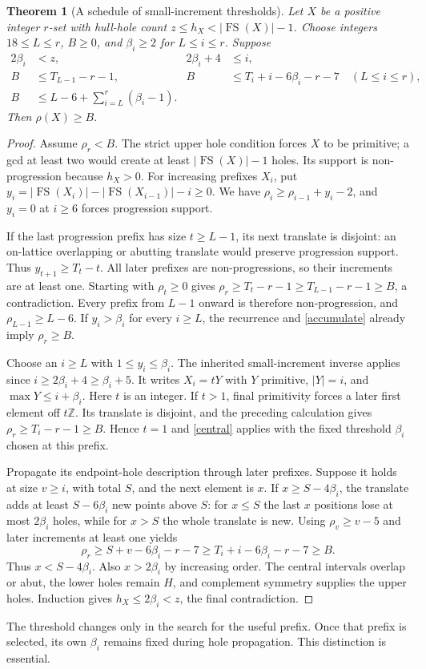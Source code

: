\documentclass[11pt,a4paper]{article}
\newcommand{\FS}{\operatorname{FS}}
\newcommand{\Z}{\mathbb Z}
\newtheorem{theorem}{Theorem}[section]
\begin{document}
\begin{theorem}[A schedule of small-increment thresholds]\label{schedule}
Let $X$ be a positive integer $r$-set with hull-hole count
$z\le h_X<|\FS(X)|-1$. Choose integers $18\le L\le r$, $B\ge0$,
and $\beta_i\ge2$ for $L\le i\le r$. Suppose
\begin{align}
 2\beta_i&<z,& 2\beta_i+4&\le i,\label{local}\\
 B&\le T_{L-1}-r-1,&
 B&\le T_i+i-6\beta_i-r-7\quad(L\le i\le r),\label{escape}\\
 B&\le L-6+\sum_{i=L}^r(\beta_i-1).&&\label{accumulate}
\end{align}
Then $\rho(X)\ge B$.
\end{theorem}
\begin{proof}
Assume $\rho_r<B$. The strict upper hole condition forces $X$ to
be primitive; a gcd at least two would create at least
$|\FS(X)|-1$ holes. Its support is non-progression because $h_X>0$.
For increasing prefixes $X_i$, put
$y_i=|\FS(X_i)|-|\FS(X_{i-1})|-i\ge0$.
We have $\rho_i\ge\rho_{i-1}+y_i-2$, and $y_i=0$ at $i\ge6$
forces progression support.

If the last progression prefix has size $t\ge L-1$, its next
translate is disjoint: an on-lattice overlapping or abutting translate
would preserve progression support. Thus $y_{t+1}\ge T_t-t$.
All later prefixes are non-progressions, so their increments are at
least one. Starting with $\rho_t\ge0$ gives
$\rho_r\ge T_t-r-1\ge T_{L-1}-r-1\ge B$, a contradiction.
Every prefix from $L-1$ onward is therefore non-progression, and
$\rho_{L-1}\ge L-6$. If $y_i>\beta_i$ for every $i\ge L$,
the recurrence and \eqref{accumulate} already imply $\rho_r\ge B$.

Choose an $i\ge L$ with $1\le y_i\le\beta_i$.
The inherited small-increment inverse applies since
$i\ge2\beta_i+4\ge\beta_i+5$. It writes $X_i=tY$ with $Y$
primitive, $|Y|=i$, and $\max Y\le i+\beta_i$. Here $t$ is an integer.
If $t>1$, final primitivity forces a later first element off $t\Z$.
Its translate is disjoint, and the preceding calculation gives
$\rho_r\ge T_i-r-1\ge B$. Hence $t=1$ and \eqref{central} applies
with the fixed threshold $\beta_i$ chosen at this prefix.

Propagate its endpoint-hole description through later prefixes.
Suppose it holds at size $v\ge i$, with total $S$, and the next
element is $x$. If $x\ge S-4\beta_i$, the translate adds at least
$S-6\beta_i$ new points above $S$: for $x\le S$ the last $x$
positions lose at most $2\beta_i$ holes, while for $x>S$ the whole
translate is new. Using $\rho_v\ge v-5$ and later increments
at least one yields
\[
 \rho_r\ge S+v-6\beta_i-r-7
 \ge T_i+i-6\beta_i-r-7\ge B.
\]
Thus $x<S-4\beta_i$. Also $x>2\beta_i$ by increasing order.
The central intervals overlap or abut, the lower holes remain $H$,
and complement symmetry supplies the upper holes. Induction gives
$h_X\le2\beta_i<z$, the final contradiction.
\end{proof}
The threshold changes only in the search for the useful prefix.
Once that prefix is selected, its own $\beta_i$ remains fixed during
hole propagation. This distinction is essential.
\end{document}
